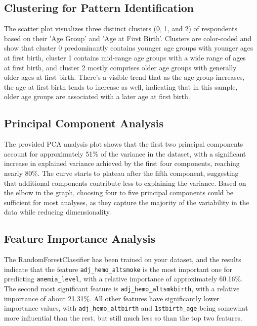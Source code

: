 \subsection{Clustering for Pattern Identification }

The scatter plot visualizes three distinct clusters (0, 1, and 2) of respondents based on their 'Age Group' and 'Age at First Birth'. Clusters are color-coded and show that cluster 0 predominantly contains younger age groups with younger ages at first birth, cluster 1 contains mid-range age groups with a wide range of ages at first birth, and cluster 2 mostly comprises older age groups with generally older ages at first birth. There's a visible trend that as the age group increases, the age at first birth tends to increase as well, indicating that in this sample, older age groups are associated with a later age at first birth.



\subsection{Principal Component Analysis}


The provided PCA analysis plot shows that the first two principal components account for approximately 51\% of the variance in the dataset, with a significant increase in explained variance achieved by the first four components, reaching nearly 80\%. The curve starts to plateau after the fifth component, suggesting that additional components contribute less to explaining the variance. Based on the elbow in the graph, choosing four to five principal components could be sufficient for most analyses, as they capture the majority of the variability in the data while reducing dimensionality.



\subsection{Feature Importance Analysis}

The RandomForestClassifier has been trained on your dataset, and the results indicate that the feature \texttt{adj\_hemo\_altsmoke} is the most important one for predicting \texttt{anemia\_level}, with a relative importance of approximately 60.16\%. The second most significant feature is \texttt{adj\_hemo\_altsmkbirth}, with a relative importance of about 21.31\%. All other features have significantly lower importance values, with \texttt{adj\_hemo\_altbirth} and \texttt{1stbirth\_age} being somewhat more influential than the rest, but still much less so than the top two features.


